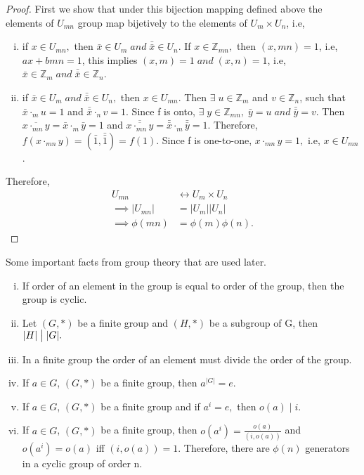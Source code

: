 \documentclass[10pt,a4paper]{article}
\begin{document}
\begin{proof}
First we show that under this bijection mapping defined above the elements of $U_{mn}$ group map bijetively to the elements of $U_m\times U_n$, i.e,
\begin{enumerate}[i)]
\item if $x\in U_{mn},$ then $\bar{x}\in U_m\;and\;\bar{\bar{x}}\in U_n.$ If $x\in\mathbb{Z}_{mn},$ then $(x,mn)=1$, i.e, $ax+bmn=1$, this implies $(x,m)=1\;and\;(x,n)=1$, i.e, $\bar{x}\in\mathbb{Z}_m\;and\;\bar{\bar{x}}\in\mathbb{Z}_n$.
\item if $\bar{x}\in U_m\;and\;\bar{\bar{x}}\in U_n,$ then $x\in U_{mn}$. Then $\exists\;u\in\mathbb{Z}_m$ and $v\in\mathbb{Z}_n$, such that $\bar{x}\cdot_m u=1$ and $\bar{\bar{x}}\cdot_n v=1$. Since f is onto, $\exists\;y\in\mathbb{Z}_{mn},\;\bar{y}=u\;and\;\bar{\bar{y}}=v.$ Then $\overline{x\cdot_{mn}y}=\bar{x}\cdot_m\bar{y}=1$ and $\overline{\overline{x\cdot_{mn}y}}=\bar{\bar{x}}\cdot_m\bar{\bar{y}}=1$. Therefore, $f(x\cdot_{mn}y)=(\bar{1},\bar{\bar{1}})=f(1)$. Since f is one-to-one, $x\cdot_{mn}y=1,$ i.e, $x\in U_{mn}$.
\end{enumerate}
Therefore, 
\begin{align*}
U_{mn}&\leftrightarrow U_m\times U_n\\
\implies |U_{mn}|&=|U_m||U_n|\\
\implies \phi(mn)&=\phi(m)\phi(n).
\end{align*}
\end{proof}

\begin{theorem}
Some important facts from group theory that are used later.
\begin{enumerate}[i)]
\item If order of an element in the group is equal to order of the group, then the group is cyclic.
\item Let $(G,*)$ be a finite group and $(H,*)$ be a subgroup of G, then $|H|\bigm\vert|G|.$
\item In a  finite group the order of an element must divide the order of the group.
\item If $a\in G$, $(G,*)$ be a finite group, then $a^{|G|}=e.$
\item If $a\in G$, $(G,*)$ be a finite group and if $a^i=e,$ then $o(a)\mid i.$
\item If $a\in G$, $(G,*)$ be a finite group, then $o(a^i)=\frac{o(a)}{(i,o(a))}$ and $o(a^i)=o(a)$ iff $(i,o(a))=1.$ Therefore, there are $\phi(n)$ generators in a cyclic group of order n.
\end{enumerate}
\end{theorem}
\end{document}
